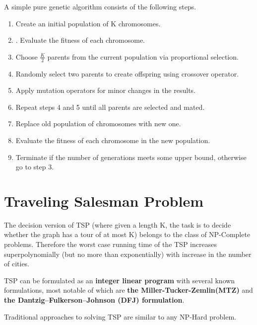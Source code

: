 \documentclass[11pt]{article}
\begin{document}
A simple pure genetic algorithm consists of the following steps.
\indent
\begin{enumerate}
\item Create an initial population of K chromosomes.
\item. Evaluate the fitness of each chromosome.
\item Choose $\frac{K}{2} $ parents from the current population via proportional selection.
\item Randomly select two parents to create offspring using crossover operator.
\item Apply mutation operators for minor changes in the results.
\item Repeat steps 4 and 5 until all parents are selected and mated.
\item Replace old population of chromosomes with new one.
\item Evaluate the fitness of each chromosome in the new population.
\item Terminate if the number of generations meets some upper bound, otherwise go to step 3.
\end{enumerate}

\section{Traveling Salesman Problem}
The decision version of TSP (where given a length K, the task is to decide whether the graph has a tour of at most K) belongs to the class of NP-Complete problems. Therefore the worst case running time of the TSP increases superpolynomially (but no more than exponentially) with increase in the number of cities.  \par

TSP can be formulated as an \textbf{integer linear program}\cite{ilp1, ilp2, ilp3} with several known formulations, most notable of which are \textbf{the Miller-Tucker-Zemlin(MTZ)} and \textbf{the Dantzig–Fulkerson–Johnson (DFJ) formulation}. \par
Traditional approaches to solving TSP are similar to any NP-Hard problem.
\end{document}
